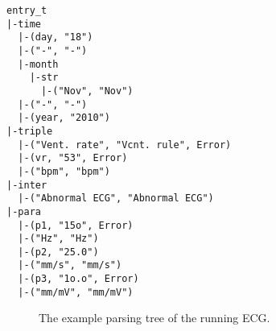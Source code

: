 




\newsavebox{\prflisting}
\begin{lrbox}{\prflisting}%
\begin{lstlisting}
entry_t
|-time
  |-(day, "18")
  |-("-", "-")
  |-month
    |-str
      |-("Nov", "Nov")
  |-("-", "-")
  |-(year, "2010")
|-triple
  |-("Vent. rate", "Vcnt. rule", Error)
  |-(vr, "53", Error)
  |-("bpm", "bpm")
|-inter
  |-("Abnormal ECG", "Abnormal ECG")
|-para
  |-(p1, "15o", Error)
  |-("Hz", "Hz")
  |-(p2, "25.0")
  |-("mm/s", "mm/s")
  |-(p3, "1o.o", Error)
  |-("mm/mV", "mm/mV")
\end{lstlisting}
\end{lrbox}

\begin{figure}[ht]
\subfloat{
\scalebox{1}{\usebox{\prflisting}}}
\caption{The example parsing tree of the running ECG.}
\label{fig:running-parsing-tree}
\end{figure}

